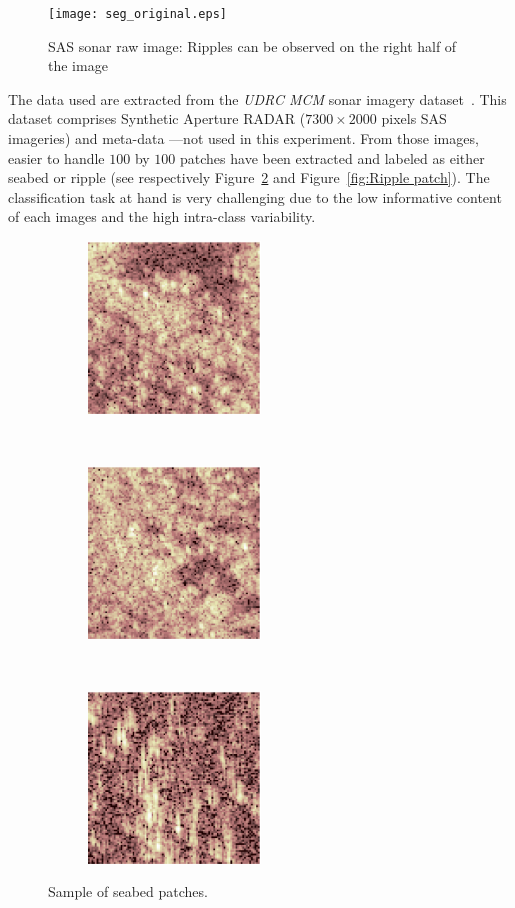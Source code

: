 \documentclass[a4paper,11pt]{report}
\begin{document}
		\begin{figure}[h]
			\centering
			\texttt{[image: seg\_original.eps]}
			\caption[SAS sonar raw image.]{SAS sonar raw image: Ripples can be observed on the right half of the image}
			\label{fir:SAS raw}
		\end{figure}		
		
		The data used are extracted from the \textit{UDRC MCM} sonar imagery dataset~\citep{udrc2015sonar}. This dataset comprises Synthetic Aperture RADAR ($7300 \times 2000$ pixels SAS imageries) and meta-data ---not used in this experiment. From those images, easier to handle $100$ by $100$ patches have been extracted and labeled as either seabed or ripple (see respectively Figure~\ref{fig:Seabed patch} and Figure~\ref{fig:Ripple patch}). The classification task at hand is very challenging due to the low informative content of each images and the high intra-class variability.\\

		\begin{figure}[h]
			\centering
			\begin{subfigure}[t]{0.3\textwidth}
				\centering
				\includegraphics[height=1.8in]{patch_seabed_1.eps}
			\end{subfigure}%
			~ 
			\begin{subfigure}[t]{0.3\textwidth}
        \centering
        \includegraphics[height=1.8in]{patch_seabed_2.eps}
			\end{subfigure}
			~
			\begin{subfigure}[t]{0.3\textwidth}
        \centering
        \includegraphics[height=1.8in]{patch_seabed_3.eps}
			\end{subfigure}
			\caption{Sample of seabed patches.}
			\label{fig:Seabed patch}
		\end{figure}
		
\end{document}

